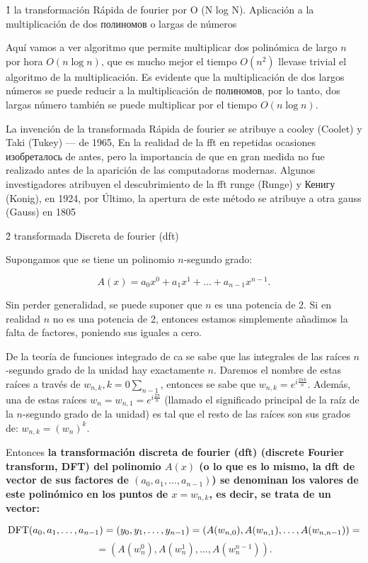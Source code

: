 \h1{ la transformación Rápida de fourier por O (N log N). Aplicación a la multiplicación de dos полиномов o largas de números }

Aquí vamos a ver algoritmo que permite multiplicar dos polinómica de largo $n$ por hora $O(n \log n)$, que es mucho mejor el tiempo $O(n^2)$ llevase trivial el algoritmo de la multiplicación. Es evidente que la multiplicación de dos largos números se puede reducir a la multiplicación de полиномов, por lo tanto, dos largas número también se puede multiplicar por el tiempo $O(n \log n)$.

La invención de la transformada Rápida de fourier se atribuye a cooley (Coolet) y Taki (Tukey) --- de 1965, En la realidad de la fft en repetidas ocasiones изобреталось de antes, pero la importancia de que en gran medida no fue realizado antes de la aparición de las computadoras modernas. Algunos investigadores atribuyen el descubrimiento de la fft runge (Runge) y Кенигу (Konig), en 1924, por Último, la apertura de este método se atribuye a otra gauss (Gauss) en 1805


\h2{ transformada Discreta de fourier (dft) }

Supongamos que se tiene un polinomio $n$-segundo grado:

$$ A(x) = a_0 x^0 + a_1 x^1 + \ldots + a_{n-1} x^{n-1}. $$

Sin perder generalidad, se puede suponer que $n$ es una potencia de 2. Si en realidad $n$ no es una potencia de 2, entonces estamos simplemente añadimos la falta de factores, poniendo sus iguales a cero.

De la teoría de funciones integrado de ca se sabe que las integrales de las raíces $n$-segundo grado de la unidad hay exactamente $n$. Daremos el nombre de estas raíces a través de $w_{n,k}, k = 0 \sum_ {n-1}$, entonces se sabe que $w_{n,k} = e^{ i \frac{ 2 \pi k }{ n } }$. Además, una de estas raíces $w_n = w_{n,1} = e^{ i \frac{ 2 \pi }{ n } }$ (llamado el significado principal de la raíz de la $n$-segundo grado de la unidad) es tal que el resto de las raíces son sus grados de: $w_{n,k} = (w_n)^k$.

Entonces \bf{la transformación discreta de fourier (dft)} (discrete Fourier transform, DFT) del polinomio $A(x)$ (o lo que es lo mismo, la dft de vector de sus factores de $(a_0, a_1, \dots, a_{n-1})$) se denominan los valores de este polinómico en los puntos de $x = w_{n,k}$, es decir, se trata de un vector:

$$ {\rm DFT}(a_0, a_1, \ldots, a_{n-1}) = (y_0, y_1, \ldots, y_{n-1}) = (A(w_{n,0}), A(w_{n,1}), \ldots, A(w_{n,n-1})) = $$
$$ = (A(w_n^0), A(w_n^1), \ldots, A(w_n^{n-1})). $$

